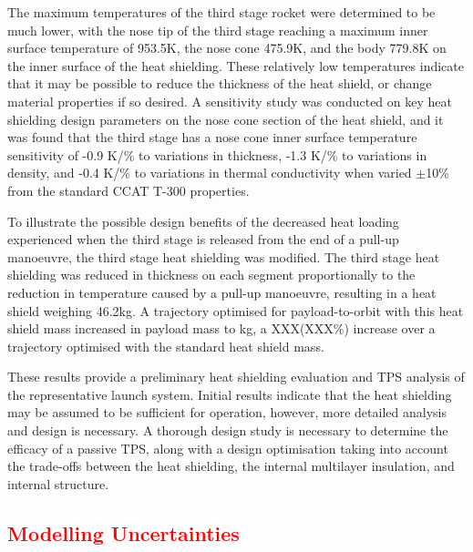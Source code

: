 The maximum temperatures of the third stage rocket were determined to be much lower, with the nose tip of the third stage reaching a maximum inner surface temperature of 953.5K, the nose cone  475.9K, and the body 779.8K on the inner surface of the heat shielding. These relatively low temperatures indicate that it may be possible to reduce the thickness of the heat shield, or change material properties if so desired. A sensitivity study was conducted on key heat shielding design parameters on the nose cone section of the heat shield, and it was found that the third stage has a nose cone inner surface temperature sensitivity of -0.9 K/\% to variations in thickness, -1.3 K/\% to variations in density, and -0.4 K/\% to variations in thermal conductivity when varied $\pm$10\% from the standard CCAT T-300 properties. 

To illustrate the possible design benefits of the decreased heat loading experienced when the third stage is released from the end of a pull-up manoeuvre, the third stage heat shielding was modified. The third stage heat shielding was reduced in thickness on each segment proportionally to the reduction in temperature  caused by a pull-up manoeuvre, resulting in a heat shield weighing 46.2kg. A trajectory optimised for payload-to-orbit with this heat shield mass increased in payload mass to \PayloadToOrbitTPSreduced kg, a  XXX(XXX\%) increase over a trajectory optimised with the standard heat shield mass.

These results provide a preliminary heat shielding evaluation and TPS analysis of the representative launch system. Initial results indicate that the heat shielding may be assumed to be sufficient for operation, however, more detailed analysis and design is necessary. A thorough design study is necessary to determine the efficacy of a passive TPS, along with a design optimisation taking into account the trade-offs between the heat shielding, the internal multilayer insulation, and internal structure. 


\textcolor{red}{
\chapter{Modelling Uncertainties}
}



